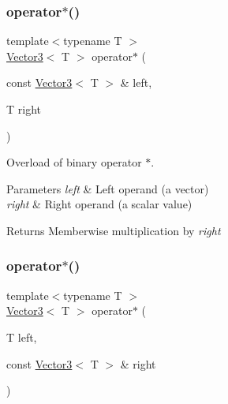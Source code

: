 \subsubsection{\texorpdfstring{operator$\ast$()}{operator*()}\hspace{0.1cm}{\footnotesize\ttfamily [1/2]}}
{\footnotesize\ttfamily template$<$typename T $>$ \\
\hyperlink{classsf_1_1_vector3}{Vector3}$<$ T $>$ operator$\ast$ (\begin{DoxyParamCaption}\item[{const \hyperlink{classsf_1_1_vector3}{Vector3}$<$ T $>$ \&}]{left,  }\item[{T}]{right }\end{DoxyParamCaption})\hspace{0.3cm}{\ttfamily [related]}}



Overload of binary operator $\ast$. 


\begin{DoxyParams}{Parameters}
{\em left} & Left operand (a vector) \\
\hline
{\em right} & Right operand (a scalar value)\\
\hline
\end{DoxyParams}
\begin{DoxyReturn}{Returns}
Memberwise multiplication by {\itshape right} 
\end{DoxyReturn}
\mbox{\label{classsf_1_1_vector3_aa6f2b0d9f79c1b9774759b7087affbb1}} 
\subsubsection{\texorpdfstring{operator$\ast$()}{operator*()}\hspace{0.1cm}{\footnotesize\ttfamily [2/2]}}
{\footnotesize\ttfamily template$<$typename T $>$ \\
\hyperlink{classsf_1_1_vector3}{Vector3}$<$ T $>$ operator$\ast$ (\begin{DoxyParamCaption}\item[{T}]{left,  }\item[{const \hyperlink{classsf_1_1_vector3}{Vector3}$<$ T $>$ \&}]{right }\end{DoxyParamCaption})\hspace{0.3cm}{\ttfamily [related]}}



